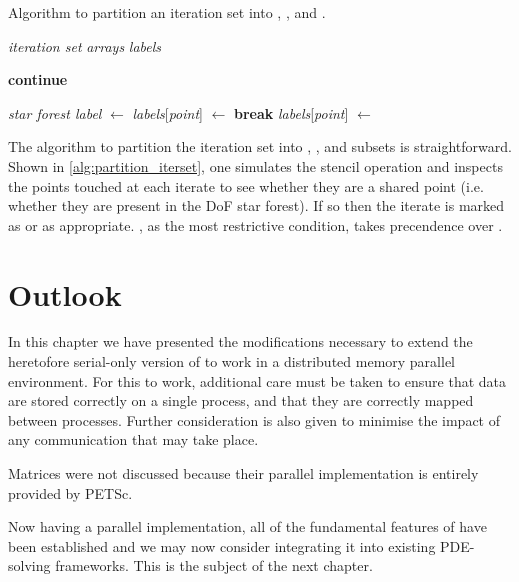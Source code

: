 \documentclass[thesis]{subfiles}
\begin{document}
\begin{algorithm}
  \caption{
    Algorithm to partition an iteration set into \coreiter{}, \rootiter{}, and \leafiter{}.
  }
  \begin{algorithmic}[1]
    \Require \textit{iteration set}
    \Require \textit{arrays} 
    \Require \textit{labels} 

       
         
          \State \textbf{continue}
        \EndIf

            \State \textit{star forest label} $\gets$ 
              \State \textit{labels}[\textit{point}] $\gets$ \leafiter{}
              \State \textbf{break} 
            \Else
              \State \textit{labels}[\textit{point}] $\gets$ \rootiter{}
            \EndIf
          \EndIf
        \EndFor
      \EndFor
    \EndFor
  \end{algorithmic}
  \label{alg:partition_iterset}
\end{algorithm}

The algorithm to partition the iteration set into \coreiter{}, \rootiter{}, and \leafiter{} subsets is straightforward.
Shown in \cref{alg:partition_iterset}, one simulates the stencil operation and inspects the points touched at each iterate to see whether they are a shared point (i.e. whether they are present in the DoF star forest).
If so then the iterate is marked as \rootiter{} or \leafiter{} as appropriate.
\leafiter{}, as the most restrictive condition, takes precendence over \rootiter{}.

\section{Outlook}

In this chapter we have presented the modifications necessary to extend the heretofore serial-only version of  to work in a distributed memory parallel environment.
For this to work, additional care must be taken to ensure that data are stored correctly on a single process, and that they are correctly mapped between processes.
Further consideration is also given to minimise the impact of any communication that may take place.

Matrices were not discussed because their parallel implementation is entirely provided by PETSc.

Now having a parallel implementation, all of the fundamental features of  have been established and we may now consider integrating it into existing PDE-solving frameworks.
This is the subject of the next chapter.
\end{document}
